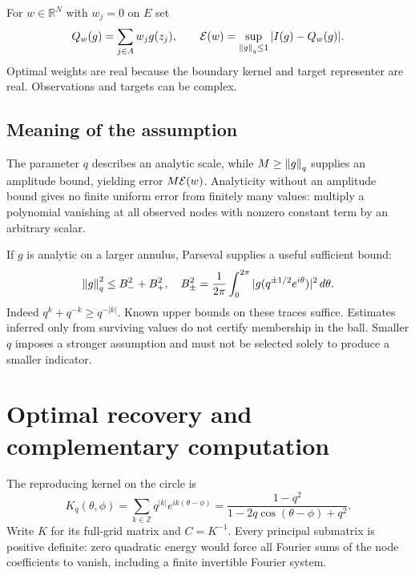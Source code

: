 \documentclass[11pt]{article}
\begin{document}
For $w\in\mathbb R^N$ with $w_j=0$ on $E$ set
\begin{equation}
Q_w(g)=\sum_{j\in A}w_jg(z_j),\qquad
\mathcal E(w)=\sup_{\left\lVert g\right\rVert_q\le1}|I(g)-Q_w(g)|.
\label{eq:error}
\end{equation}
Optimal weights are real because the boundary kernel and target representer are real. Observations and targets can be complex.

\subsection{Meaning of the assumption}
The parameter $q$ describes an analytic scale, while $M\ge\left\lVert g\right\rVert_q$ supplies an amplitude bound, yielding error $M\mathcal E(w)$. Analyticity without an amplitude bound gives no finite uniform error from finitely many values: multiply a polynomial vanishing at all observed nodes with nonzero constant term by an arbitrary scalar.

If $g$ is analytic on a larger annulus, Parseval supplies a useful sufficient bound:
\begin{equation}
\left\lVert g\right\rVert_q^2\le B_-^2+B_+^2,\quad
B_\pm^2=\frac1{2\pi}\int_0^{2\pi}|g(q^{\pm1/2}e^{i\theta})|^2\,d\theta.
\label{eq:boundary}
\end{equation}
Indeed $q^k+q^{-k}\ge q^{-|k|}$. Known upper bounds on these traces suffice. Estimates inferred only from surviving values do not certify membership in the ball. Smaller $q$ imposes a stronger assumption and must not be selected solely to produce a smaller indicator.

\section{Optimal recovery and complementary computation}
The reproducing kernel on the circle is
\begin{equation}
K_q(\theta,\phi)=\sum_{k\in\mathbb Z}q^{|k|}e^{ik(\theta-\phi)}
=\frac{1-q^2}{1-2q\cos(\theta-\phi)+q^2}.
\label{eq:kernel}
\end{equation}
Write $K$ for its full-grid matrix and $C=K^{-1}$. Every principal submatrix is positive definite: zero quadratic energy would force all Fourier sums of the node coefficients to vanish, including a finite invertible Fourier system.
\end{document}
